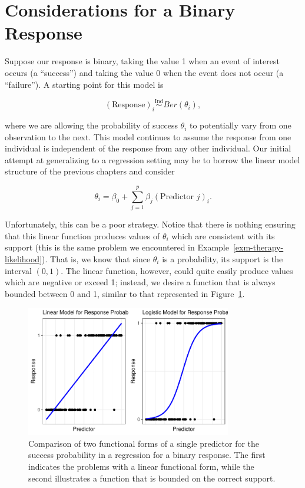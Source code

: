 \documentclass[
  letterpaper,
  DIV=11,
  numbers=noendperiod]{scrreprt}
\theoremstyle{definition}
\theoremstyle{definition}
\theoremstyle{plain}
\theoremstyle{remark}
\begin{document}
\hypertarget{considerations-for-a-binary-response}{%
\section{Considerations for a Binary
Response}\label{considerations-for-a-binary-response}}

Suppose our response is binary, taking the value 1 when an event of
interest occurs (a ``success'') and taking the value 0 when the event
does not occur (a ``failure''). A starting point for this model is

\[(\text{Response})_i \stackrel{\text{Ind}}{\sim}Ber\left(\theta_i\right),\]

where we are allowing the probability of success \(\theta_i\) to
potentially vary from one observation to the next. This model continues
to assume the response from one individual is independent of the
response from any other individual. Our initial attempt at generalizing
to a regression setting may be to borrow the linear model structure of
the previous chapters and consider

\[\theta_i = \beta_0 + \sum_{j=1}^{p} \beta_j (\text{Predictor } j)_i.\]

Unfortunately, this can be a poor strategy. Notice that there is nothing
ensuring that this linear function produces values of \(\theta_i\) which
are consistent with its support (this is the same problem we encountered
in Example~\ref{exm-therapy-likelihood}). That is, we know that since
\(\theta_i\) is a probability, its support is the interval \((0, 1)\).
The linear function, however, could quite easily produce values which
are negative or exceed 1; instead, we desire a function that is always
bounded between 0 and 1, similar to that represented in
Figure~\ref{fig-logistic-regression}.

\begin{figure}

{\centering \includegraphics[width=0.8\textwidth,height=\textheight]{./images/fig-logistic-regression-1.pdf}

}

\caption{\label{fig-logistic-regression}Comparison of two functional
forms of a single predictor for the success probability in a regression
for a binary response. The first indicates the problems with a linear
functional form, while the second illustrates a function that is bounded
on the correct support.}

\end{figure}
\end{document}
